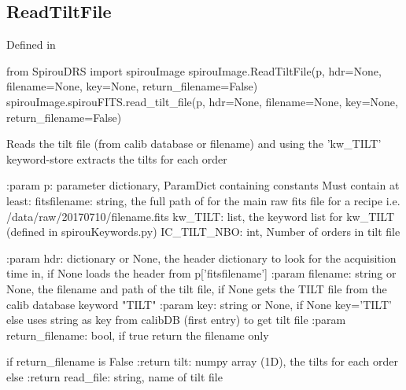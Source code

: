 \noindent\begin{minipage}{\textwidth}
\subsection{ReadTiltFile}

Defined in \spirouImage{}

\begin{pythonbox}
from SpirouDRS import spirouImage
spirouImage.ReadTiltFile(p, hdr=None, filename=None, key=None, return_filename=False)
spirouImage.spirouFITS.read_tilt_file(p, hdr=None, filename=None, key=None, return_filename=False)
\end{pythonbox}

\begin{pythondocstring}
  Reads the tilt file (from calib database or filename) and using the
  'kw_TILT' keyword-store extracts the tilts for each order

  :param p: parameter dictionary, ParamDict containing constants
      Must contain at least:
              fitsfilename: string, the full path of for the main raw fits
                            file for a recipe
                            i.e. /data/raw/20170710/filename.fits
              kw_TILT: list, the keyword list for kw_TILT (defined in
                       spirouKeywords.py)
              IC_TILT_NBO: int, Number of orders in tilt file

  :param hdr: dictionary or None, the header dictionary to look for the
                   acquisition time in, if None loads the header from
                   p['fitsfilename']
  :param filename: string or None, the filename and path of the tilt file,
                   if None gets the TILT file from the calib database
                   keyword "TILT"
  :param key: string or None, if None key='TILT' else uses string as key
              from calibDB (first entry) to get tilt file
  :param return_filename: bool, if true return the filename only

  if return_filename is False
      :return tilt: numpy array (1D), the tilts for each order
  else
      :return read_file: string, name of tilt file
\end{pythondocstring}
\end{minipage}


